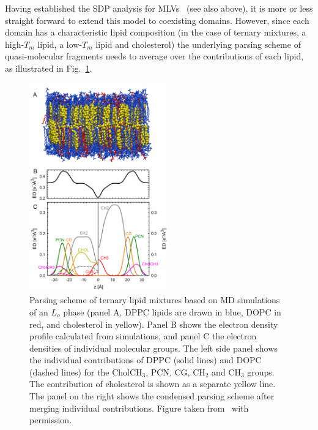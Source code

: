 \documentclass[8.5pt,twoside,twocolumn]{article}
\begin{document}
Having established the SDP analysis for MLVs~\cite{Heftberger.2014} (see also above), it is more or less straight forward to extend this model to coexisting domains. However, since each domain has a characteristic lipid composition (in the case of ternary mixtures, a high-$T_m$ lipid, a low-$T_m$ lipid and cholesterol) the underlying parsing scheme of quasi-molecular fragments needs to average over the contributions of each lipid, as illustrated in Fig.~\ref{fig:SAXS_parsing_domains}. 

\begin{figure} [t]
	\centering
	\includegraphics[height=9cm]{figures/parsing_scheme_domains.pdf}
	\caption{Parsing scheme of ternary lipid mixtures based on MD simulations of an $L_o$ phase (panel A, DPPC lipids are drawn in blue, DOPC in red, and cholesterol in yellow). Panel B shows the electron density profile calculated from simulations, and panel C the electron densities of individual molecular groups. The left side panel shows the individual contributions of DPPC (solid lines) and DOPC (dashed lines) for the CholCH$_3$, PCN, CG, CH$_2$ and CH$_3$ groups. The contribution of cholesterol is shown as a separate yellow line. The panel on the right shows the condensed parsing scheme after merging individual contributions. Figure taken from~\cite{Heftberger.2015} with permission.}
	\label{fig:SAXS_parsing_domains}
\end{figure}
\end{document}
